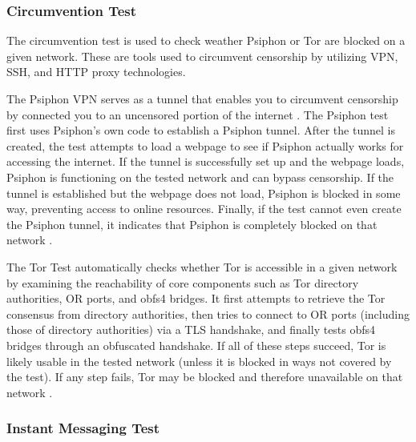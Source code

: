 \subsubsection{Circumvention Test}

The circumvention test is used to check weather Psiphon or Tor are blocked on a given network. These are tools used to circumvent censorship by utilizing VPN, SSH, and HTTP proxy technologies. 

The Psiphon VPN serves as a tunnel that enables you to circumvent censorship by connected you to an uncensored portion of the internet \cite{ooniPsiphonTest}. The Psiphon test first uses Psiphon’s own code to establish a Psiphon tunnel. After the tunnel is created, the test attempts to load a webpage to see if Psiphon actually works for accessing the internet. If the tunnel is successfully set up and the webpage loads, Psiphon is functioning on the tested network and can bypass censorship. If the tunnel is established but the webpage does not load, Psiphon is blocked in some way, preventing access to online resources. Finally, if the test cannot even create the Psiphon tunnel, it indicates that Psiphon is completely blocked on that network \cite{PsiphonTestGitHub}.

The Tor Test \cite{TorTestABOUTOONI} automatically checks whether Tor is accessible in a given network by examining the reachability of core components such as Tor directory authorities, OR ports, and obfs4 bridges. It first attempts to retrieve the Tor consensus from directory authorities, then tries to connect to OR ports (including those of directory authorities) via a TLS handshake, and finally tests obfs4 bridges through an obfuscated handshake. If all of these steps succeed, Tor is likely usable in the tested network (unless it is blocked in ways not covered by the test). If any step fails, Tor may be blocked and therefore unavailable on that network \cite{TorTestGitHub}.


\subsubsection{Instant Messaging Test}

